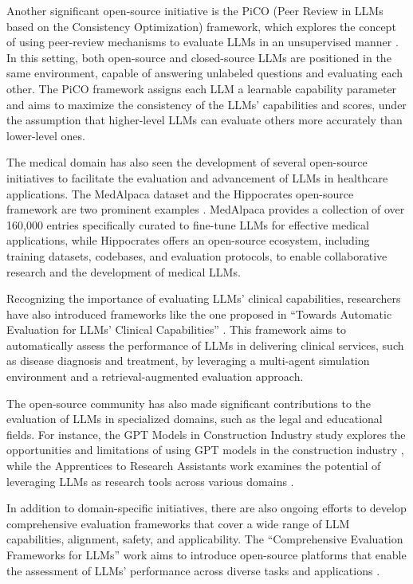 \documentclass[11pt]{article}
\begin{document}
Another significant open-source initiative is the PiCO (Peer Review in LLMs based on the Consistency Optimization) framework, which explores the concept of using peer-review mechanisms to evaluate LLMs in an unsupervised manner \cite{ref84}. In this setting, both open-source and closed-source LLMs are positioned in the same environment, capable of answering unlabeled questions and evaluating each other. The PiCO framework assigns each LLM a learnable capability parameter and aims to maximize the consistency of the LLMs' capabilities and scores, under the assumption that higher-level LLMs can evaluate others more accurately than lower-level ones.

The medical domain has also seen the development of several open-source initiatives to facilitate the evaluation and advancement of LLMs in healthcare applications. The MedAlpaca dataset and the Hippocrates open-source framework are two prominent examples \cite{ref85,ref86}. MedAlpaca provides a collection of over 160,000 entries specifically curated to fine-tune LLMs for effective medical applications, while Hippocrates offers an open-source ecosystem, including training datasets, codebases, and evaluation protocols, to enable collaborative research and the development of medical LLMs.

Recognizing the importance of evaluating LLMs' clinical capabilities, researchers have also introduced frameworks like the one proposed in ``Towards Automatic Evaluation for LLMs' Clinical Capabilities'' \cite{ref87}. This framework aims to automatically assess the performance of LLMs in delivering clinical services, such as disease diagnosis and treatment, by leveraging a multi-agent simulation environment and a retrieval-augmented evaluation approach.

The open-source community has also made significant contributions to the evaluation of LLMs in specialized domains, such as the legal and educational fields. For instance, the GPT Models in Construction Industry study explores the opportunities and limitations of using GPT models in the construction industry \cite{ref88}, while the Apprentices to Research Assistants work examines the potential of leveraging LLMs as research tools across various domains \cite{ref6}.

In addition to domain-specific initiatives, there are also ongoing efforts to develop comprehensive evaluation frameworks that cover a wide range of LLM capabilities, alignment, safety, and applicability. The ``Comprehensive Evaluation Frameworks for LLMs'' work aims to introduce open-source platforms that enable the assessment of LLMs' performance across diverse tasks and applications \cite{ref61}.
\end{document}
